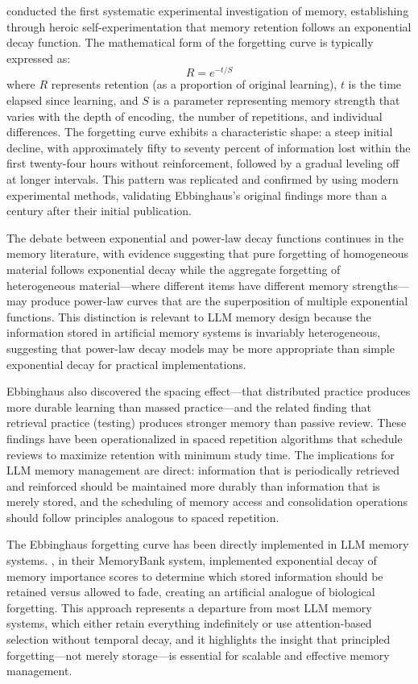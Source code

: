 \documentclass[11pt,letterpaper]{article}
\begin{document}
\cite{ebbinghaus1885memory} conducted the first systematic experimental investigation of memory, establishing through heroic self-experimentation that memory retention follows an exponential decay function. The mathematical form of the forgetting curve is typically expressed as:
\begin{equation}
R = e^{-t/S}
\end{equation}
where $R$ represents retention (as a proportion of original learning), $t$ is the time elapsed since learning, and $S$ is a parameter representing memory strength that varies with the depth of encoding, the number of repetitions, and individual differences. The forgetting curve exhibits a characteristic shape: a steep initial decline, with approximately fifty to seventy percent of information lost within the first twenty-four hours without reinforcement, followed by a gradual leveling off at longer intervals. This pattern was replicated and confirmed by \cite{murre2015replication} using modern experimental methods, validating Ebbinghaus's original findings more than a century after their initial publication.

The debate between exponential and power-law decay functions continues in the memory literature, with evidence suggesting that pure forgetting of homogeneous material follows exponential decay while the aggregate forgetting of heterogeneous material---where different items have different memory strengths---may produce power-law curves that are the superposition of multiple exponential functions. This distinction is relevant to LLM memory design because the information stored in artificial memory systems is invariably heterogeneous, suggesting that power-law decay models may be more appropriate than simple exponential decay for practical implementations.

Ebbinghaus also discovered the spacing effect---that distributed practice produces more durable learning than massed practice---and the related finding that retrieval practice (testing) produces stronger memory than passive review. These findings have been operationalized in spaced repetition algorithms that schedule reviews to maximize retention with minimum study time. The implications for LLM memory management are direct: information that is periodically retrieved and reinforced should be maintained more durably than information that is merely stored, and the scheduling of memory access and consolidation operations should follow principles analogous to spaced repetition.

The Ebbinghaus forgetting curve has been directly implemented in LLM memory systems. \cite{zhong2024memorybank}, in their MemoryBank system, implemented exponential decay of memory importance scores to determine which stored information should be retained versus allowed to fade, creating an artificial analogue of biological forgetting. This approach represents a departure from most LLM memory systems, which either retain everything indefinitely or use attention-based selection without temporal decay, and it highlights the insight that principled forgetting---not merely storage---is essential for scalable and effective memory management.
\end{document}
